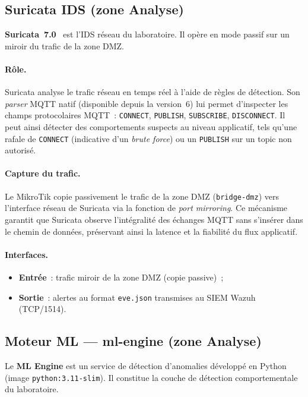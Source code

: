 \subsection{Suricata IDS (zone Analyse)}
\label{subsec:env-suricata}

\textbf{Suricata~7.0}~\cite{suricata_mqtt} est l'IDS réseau du laboratoire. Il opère en mode passif sur un miroir du trafic de la zone DMZ.

\paragraph{Rôle.}
Suricata analyse le trafic réseau en temps réel à l'aide de règles de détection. Son \emph{parser} MQTT natif (disponible depuis la version~6) lui permet d'inspecter les champs protocolaires MQTT~: \texttt{CONNECT}, \texttt{PUBLISH}, \texttt{SUBSCRIBE}, \texttt{DISCONNECT}. Il peut ainsi détecter des comportements suspects au niveau applicatif, tels qu'une rafale de \texttt{CONNECT} (indicative d'un \emph{brute force}) ou un \texttt{PUBLISH} sur un topic non autorisé.

\paragraph{Capture du trafic.}
Le MikroTik copie passivement le trafic de la zone DMZ (\texttt{bridge-dmz}) vers l'interface réseau de Suricata via la fonction de \emph{port mirroring}. Ce mécanisme garantit que Suricata observe l'intégralité des échanges MQTT sans s'insérer dans le chemin de données, préservant ainsi la latence et la fiabilité du flux applicatif.

\paragraph{Interfaces.}
\begin{itemize}[leftmargin=*]
  \item \textbf{Entrée}~: trafic miroir de la zone DMZ (copie passive)~;
  \item \textbf{Sortie}~: alertes au format \texttt{eve.json} transmises au SIEM Wazuh (TCP/1514).
\end{itemize}

\subsection{Moteur ML --- ml-engine (zone Analyse)}
\label{subsec:env-ml}

Le \textbf{ML Engine} est un service de détection d'anomalies développé en Python (image \texttt{python:3.11-slim}). Il constitue la couche de détection comportementale du laboratoire.

